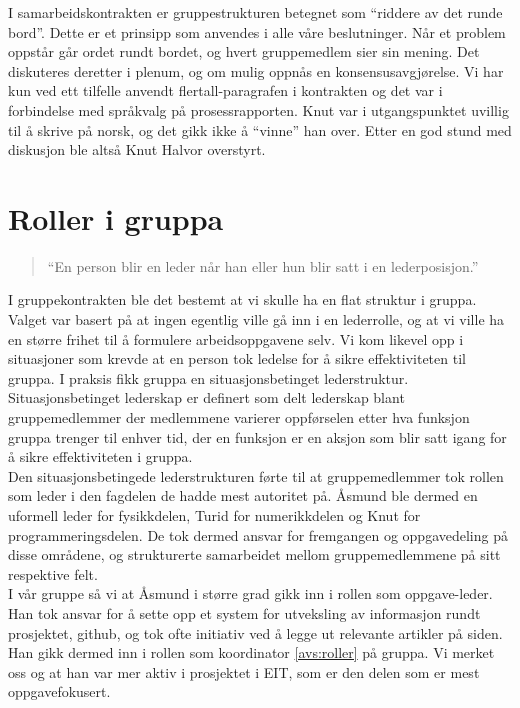 I samarbeidskontrakten er gruppestrukturen betegnet som ``riddere av det runde
bord''. Dette er et prinsipp som anvendes i alle våre beslutninger. Når et
problem oppstår går ordet rundt bordet, og hvert gruppemedlem sier sin mening.
Det diskuteres deretter i plenum, og om mulig oppnås en konsensusavgjørelse. Vi
har kun ved ett tilfelle anvendt flertall-paragrafen i kontrakten og det var i
forbindelse med språkvalg på prosessrapporten. Knut var i utgangspunktet uvillig
til å skrive på norsk, og det gikk ikke å ``vinne'' han over. Etter en god stund
med diskusjon ble altså Knut Halvor overstyrt.\\

\section{Roller i gruppa}
\begin{quote}
``En person blir en leder når han eller hun blir satt i en lederposisjon.''
\end{quote}

I gruppekontrakten ble det bestemt at vi skulle ha en flat struktur i gruppa. Valget 
var basert på at ingen egentlig ville gå inn i en lederrolle, og at vi ville ha en 
større frihet til å formulere arbeidsoppgavene selv. Vi kom likevel opp i situasjoner
som krevde at en person tok ledelse for å sikre effektiviteten til gruppa. I praksis 
fikk gruppa en situasjonsbetinget lederstruktur. Situasjonsbetinget lederskap er definert
som delt lederskap blant gruppemedlemmer der medlemmene varierer oppførselen etter hva
funksjon gruppa trenger til enhver tid, der en funksjon er en aksjon som blir satt 
igang for å sikre effektiviteten i gruppa.\\

Den situasjonsbetingede lederstrukturen førte til at gruppemedlemmer tok rollen som 
leder i den fagdelen de hadde mest autoritet på. Åsmund ble dermed en uformell leder 
for fysikkdelen, Turid for numerikkdelen og Knut for programmeringsdelen. De 
tok dermed ansvar for fremgangen og oppgavedeling på disse områdene, og strukturerte
samarbeidet mellom gruppemedlemmene på sitt respektive felt. \\

I vår gruppe så vi at Åsmund i større grad gikk inn i rollen som oppgave-leder. Han 
tok ansvar for å sette opp et system for utveksling av informasjon rundt prosjektet, 
github, og tok ofte initiativ ved å legge ut relevante artikler på siden. Han gikk 
dermed inn i rollen som koordinator \cref{avs:roller} på gruppa. Vi merket oss og at han var 
mer aktiv i prosjektet i EIT, som er den delen som er mest oppgavefokusert. \\

